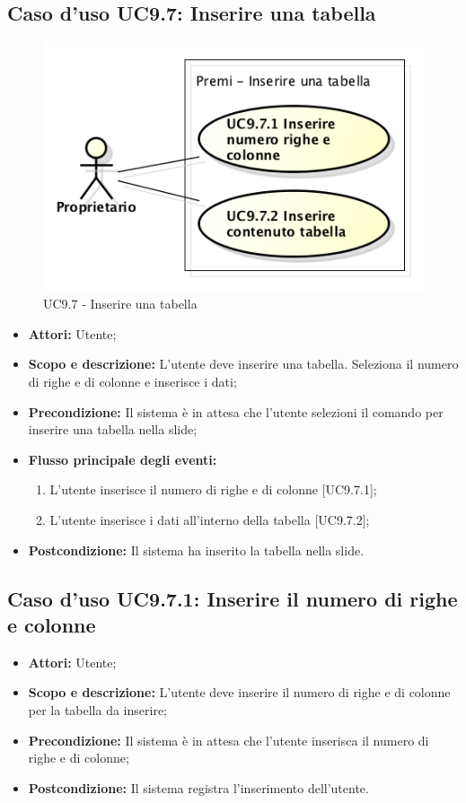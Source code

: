 \subsection{Caso d'uso UC9.7: Inserire una tabella}
\begin{figure}[h]
	\centering 
	\includegraphics[scale=0.45] {img/UC9.7.png} 
	\caption{UC9.7 - Inserire una tabella} 
\end{figure}

\begin{itemize}
	\item \textbf{Attori:} Utente;
	\item \textbf{Scopo e descrizione:} L'utente deve inserire una tabella. Seleziona il numero di righe e di colonne e inserisce i dati;
	\item \textbf{Precondizione:} Il sistema è in attesa che l'utente selezioni il comando per inserire una tabella nella slide;
	\item \textbf{Flusso principale degli eventi:}
	\begin{enumerate}
		\item L'utente inserisce il numero di righe e di colonne [UC9.7.1];
		\item L'utente inserisce i dati all'interno della tabella [UC9.7.2];
	\end{enumerate}
	\item \textbf{Postcondizione:} Il sistema ha inserito la tabella nella slide.
\end{itemize}

	\subsection{Caso d'uso UC9.7.1: Inserire il numero di righe e colonne}
	\begin{itemize}
		\item \textbf{Attori:} Utente;
		\item \textbf{Scopo e descrizione:} L'utente deve inserire il numero di righe e di colonne per la tabella da inserire;
		\item \textbf{Precondizione:} Il sistema è in attesa che l'utente inserisca il numero di righe e di colonne;
		\item \textbf{Postcondizione:} Il sistema registra l'inserimento dell'utente.
	\end{itemize}
	
